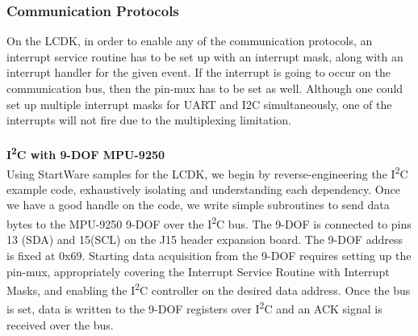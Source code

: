 \subsubsection{Communication Protocols}
On the LCDK, in order to enable any of the communication protocols, an interrupt service routine has to be set up with an interrupt mask, along with an interrupt handler for the given event. If the interrupt is going to occur on the communication bus, then the pin-mux has to be set as well. Although one could set up multiple interrupt masks for UART and I2C simultaneously, one of the interrupts will not fire due to the multiplexing limitation.\\
\\\textbf{I\textsuperscript{2}C with 9-DOF MPU-9250} \\
Using StartWare samples for the LCDK, we begin by reverse-engineering the I\textsuperscript{2}C example code, exhaustively isolating and understanding each dependency. Once we have a good handle on the code, we write simple subroutines to send data bytes to the MPU-9250 9-DOF over the I\textsuperscript{2}C bus. The 9-DOF is connected to pins 13 (SDA) and 15(SCL) on the J15 header expansion board.  The 9-DOF address is fixed at 0x69. Starting data acquisition from the 9-DOF requires setting up the pin-mux, appropriately covering the Interrupt Service Routine with Interrupt Masks, and enabling the I\textsuperscript{2}C controller on the desired data address. Once the bus is set, data is written to the 9-DOF registers over I\textsuperscript{2}C and an ACK signal is received over the bus.\\

